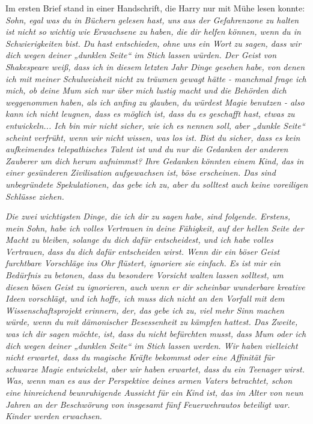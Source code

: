 {Im ersten Brief stand in einer Handschrift, die Harry nur mit Mühe lesen konnte: \emph{Sohn, egal was du in Büchern gelesen hast, uns aus der Gefahrenzone zu halten ist nicht so wichtig wie Erwachsene zu haben, die dir helfen können, wenn du in Schwierigkeiten bist. Du hast entschieden, ohne uns ein Wort zu sagen, dass wir dich wegen deiner „dunklen Seite“ im Stich lassen würden. Der Geist von Shakespeare weiß, dass ich in diesem letzten Jahr Dinge gesehen habe, von denen ich mit meiner Schulweisheit nicht zu träumen gewagt hätte - manchmal frage ich mich, ob deine Mum sich nur über mich lustig macht und die Behörden dich weggenommen haben, als ich anfing zu glauben, du würdest Magie benutzen - also kann ich nicht leugnen, dass es möglich ist, dass du es geschafft hast, etwas zu entwickeln... Ich bin mir nicht sicher, wie ich es nennen soll, aber „dunkle Seite“ scheint verfrüht, wenn wir nicht wissen, was los ist. Bist du sicher, dass es kein aufkeimendes telepathisches Talent ist und du nur die Gedanken der anderen Zauberer um dich herum aufnimmst? Ihre Gedanken könnten einem Kind, das in einer gesünderen Zivilisation aufgewachsen ist, böse erscheinen. Das sind unbegründete Spekulationen, das gebe ich zu, aber du solltest auch keine voreiligen Schlüsse ziehen.}

\emph{Die zwei wichtigsten Dinge, die ich dir zu sagen habe, sind folgende. Erstens, mein Sohn, habe ich volles Vertrauen in deine Fähigkeit, auf der hellen Seite der Macht zu bleiben, solange du dich dafür entscheidest, und ich habe volles Vertrauen, dass du dich dafür entscheiden wirst. Wenn dir ein böser Geist furchtbare Vorschläge ins Ohr flüstert, ignoriere sie einfach. Es ist mir ein Bedürfnis zu betonen, dass du besondere Vorsicht walten lassen solltest, um diesen bösen Geist zu ignorieren, auch wenn er dir scheinbar wunderbare kreative Ideen vorschlägt, und ich hoffe, ich muss dich nicht an den Vorfall mit dem Wissenschaftsprojekt erinnern, der, das gebe ich zu, viel mehr Sinn machen würde, wenn du mit dämonischer Besessenheit zu kämpfen hattest. Das Zweite, was ich dir sagen möchte, ist, dass du nicht befürchten musst, dass Mum oder ich dich wegen deiner „dunklen Seite“ im Stich lassen werden. Wir haben vielleicht nicht erwartet, dass du magische Kräfte bekommst oder eine Affinität für schwarze Magie entwickelst, aber wir haben erwartet, dass du ein Teenager wirst. Was, wenn man es aus der Perspektive deines armen Vaters betrachtet, schon eine hinreichend beunruhigende Aussicht für ein Kind ist, das im Alter von neun Jahren an der Beschwörung von insgesamt fünf Feuerwehrautos beteiligt war.}\\ \emph{Kinder werden erwachsen.}

}
